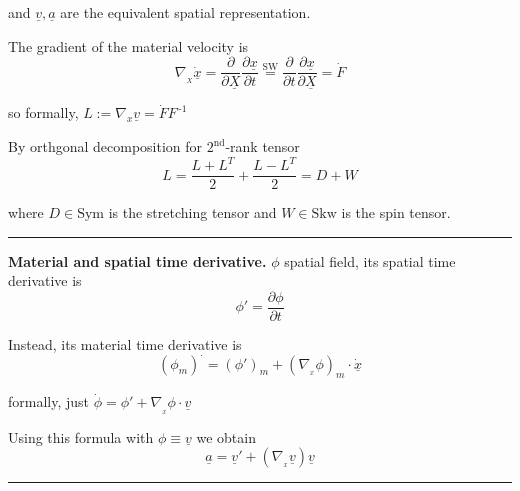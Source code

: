 and $\underline{v},\underline{a}$ are the equivalent spatial representation.

\smallskip

The gradient of the material velocity is
\begin{equation*}
\nabla_{\!\!_{X}} \dot{\underline{x}}=\frac{\partial}{\partial \underline{X}} \frac{\partial\underline{x}}{\partial t}\overset{\scriptstyle\text{SW}}{=} \frac{\partial}{\partial t} \frac{\partial \underline{x}}{\partial \underline{X}}=\dot{F}
\end{equation*}

so formally, $\boxed{L:=\nabla_{\!\!x}\underline{v}=\dot{F}F^{\,\text{-}1}}$ 

\smallskip

By orthgonal decomposition for $2^{\text{nd}}$-rank tensor
\begin{equation*}
L=\frac{L+L^T}{2} +\frac{L-L^T}{2} =D+W
\end{equation*}

where $D\in\text{Sym}$ is the stretching tensor and $W\in\text{Skw}$ is the spin tensor.

\vspace{-0.5em}

\rule{0.31\textwidth}{0.2pt}
\smallskip

\textbf{Material and spatial time derivative.} $\phi$ spatial field, its spatial time derivative is
\begin{equation*}
\phi'=\frac{\partial \phi}{\partial t}
\end{equation*}

Instead, its material time derivative is 
\begin{equation*}
\left(\phi_m\right)^\cdot=\left(\phi'\right)_m+\left( \nabla_{\!\!_x} \phi \right)_m \cdot \dot{\underline{x}}
\end{equation*}

formally, just $\boxed{\dot{\phi}=\phi'+\nabla_{\!\!_x} \phi \cdot \underline{v}}$

\smallskip

Using this formula with $\phi\equiv \underline{v}$ we obtain
\begin{equation*}
\boxed{\underline{a}=\underline{v}'+ \left(\nabla_{\!\!_x}\underline{v} \right) \underline{v}}
\end{equation*}

\rule{0.31\textwidth}{1pt}











